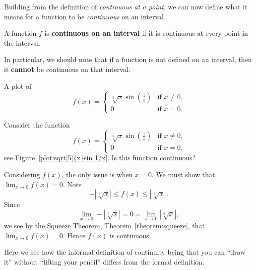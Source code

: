 Building from the definition of \textit{continuous at a point}, we can
now define what it means for a function to be \textit{continuous} on
an interval.

\begin{definition} A function $f$ is \textbf{continuous on an interval} if it is
continuous at every point in the interval.
\end{definition}

In particular, we should note that if a function is not defined on an
interval, then it \textbf{cannot} be continuous on that interval.
\begin{marginfigure}[0in]
\caption[A continuous function.]{A plot of
\[
f(x)=
\begin{cases}
\sqrt[5]{x}\sin\left(\frac{1}{x}\right) & \text{if $x \ne 0$,}\\
 0 & \text{if $x = 0$.}
\end{cases}
\]
}
\label{plot:sqrt[5]{x}sin 1/x}
\end{marginfigure}

\begin{example}
Consider the function
\[
f(x) = 
\begin{cases}
\sqrt[5]{x}\sin\left(\frac{1}{x}\right) & \text{if $x \ne 0$,}\\
0 & \text{if $x = 0$,}
\end{cases}
\]
see Figure~\ref{plot:sqrt[5]{x}sin 1/x}. Is this function continuous?
\end{example}

\begin{solution}
Considering $f(x)$, the only issue is when $x=0$. We must show that
$\lim_{x\to 0} f(x) = 0$. Note
\[
-|\sqrt[5]{x}|\le f(x) \le |\sqrt[5]{x}|.
\]
Since
\[
\lim_{x\to 0} -|\sqrt[5]{x}| = 0 = \lim_{x\to 0}|\sqrt[5]{x}|,
\]
we see by the Squeeze Theorem, Theorem~\ref{theorem:squeeze}, that
$\lim_{x\to 0} f(x) = 0$. Hence $f(x)$ is continuous.

Here we see how the informal definition of continuity being that you
can ``draw it'' without ``lifting your pencil'' differs from the
formal definition.
\end{solution}

